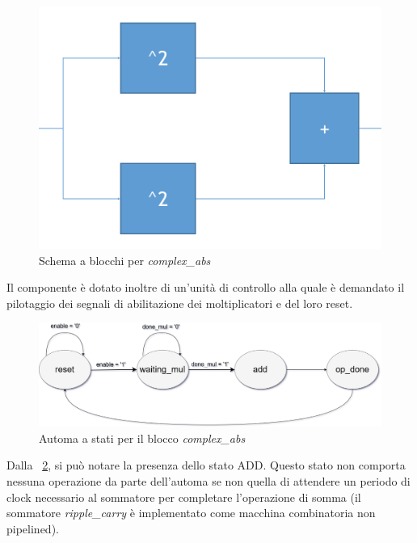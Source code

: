 \documentclass[12pt,a4paper,twoside,openany]{book}
\begin{document}
\begin{figure}[hb]
\begin{center}
\includegraphics[scale=0.5, keepaspectratio]{immagini/complexabs_schemablocchi}
\caption{Schema a blocchi per \textit{complex\_abs}}
\label{complexabs_schemablocchi}
\end{center}
\end{figure}

Il componente è dotato inoltre di un'unità di controllo alla quale è demandato il pilotaggio dei segnali di abilitazione dei moltiplicatori e del loro reset. 

\begin{figure}
\begin{center}
\includegraphics[width=\linewidth, keepaspectratio]{immagini/complexabs_fsm}
\caption{Automa a stati per il blocco \textit{complex\_abs}}
\label{complexabs_fsm}
\end{center}
\end{figure}

Dalla \figurename~\ref{complexabs_fsm}, si può notare la presenza dello stato ADD. Questo stato non comporta nessuna operazione da parte dell'automa se non quella di attendere un periodo di clock necessario al sommatore per completare l'operazione di somma (il sommatore \textit{ripple\_carry} è implementato come macchina combinatoria non pipelined).
\clearpage
\end{document}

